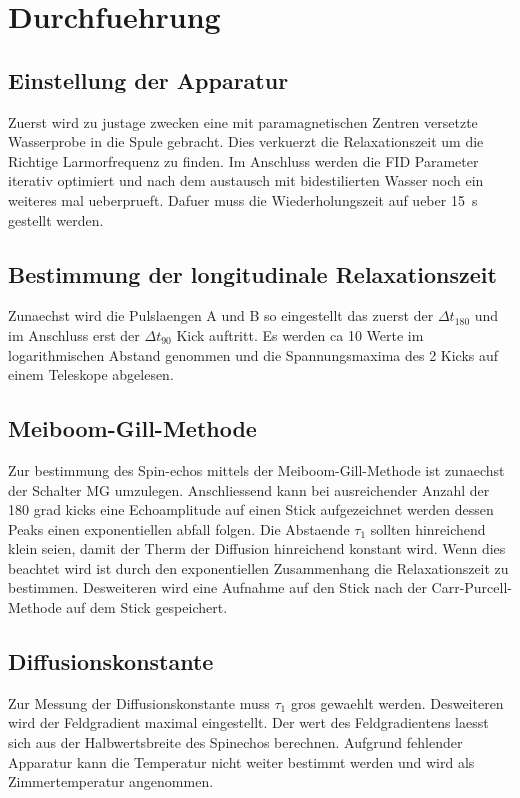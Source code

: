 \section{Durchfuehrung}%
\label{sec:durchfuehrung}

\subsection{Einstellung der Apparatur}%
\label{sub:einstellung_der_apparatur}

Zuerst wird zu justage zwecken eine mit paramagnetischen Zentren versetzte
Wasserprobe in die Spule gebracht.
Dies verkuerzt die Relaxationszeit um die Richtige Larmorfrequenz zu finden. 
Im Anschluss werden die FID Parameter iterativ optimiert und nach dem austausch
mit bidestilierten Wasser noch ein weiteres mal ueberprueft. 
Dafuer muss die Wiederholungszeit auf ueber \SI{15}{\second} gestellt werden.

\subsection{Bestimmung der longitudinale Relaxationszeit}%
\label{sub:bestimmung_der_longitudinale_relaxationszeit}
Zunaechst wird die Pulslaengen A und B so eingestellt das zuerst der 
$\Delta t_{180}$ und im Anschluss erst der $\Delta t_{90}$ Kick auftritt. 
Es werden ca 10 Werte im logarithmischen Abstand genommen und die
Spannungsmaxima des 2 Kicks auf einem Teleskope abgelesen.

\subsection{Meiboom-Gill-Methode}%
\label{sub:meiboom_gill_methode}
Zur bestimmung des Spin-echos mittels der Meiboom-Gill-Methode ist zunaechst der
Schalter MG umzulegen. Anschliessend kann bei ausreichender Anzahl der 180 grad
kicks eine Echoamplitude auf einen Stick aufgezeichnet werden dessen Peaks einen
exponentiellen abfall folgen. 
Die Abstaende $\tau_1$ sollten hinreichend klein seien, damit der Therm der
Diffusion hinreichend konstant wird.
Wenn dies beachtet wird ist durch den exponentiellen Zusammenhang die
Relaxationszeit zu bestimmen. 
Desweiteren wird eine Aufnahme auf den Stick nach der Carr-Purcell-Methode auf
dem Stick gespeichert.

\subsection{Diffusionskonstante}%
\label{sub:diffusionskonstante}
Zur Messung der Diffusionskonstante muss $\tau_1$ gros gewaehlt werden. 
Desweiteren wird der Feldgradient maximal eingestellt.
Der wert des Feldgradientens laesst sich aus der Halbwertsbreite des Spinechos
berechnen.
Aufgrund fehlender Apparatur kann die Temperatur nicht weiter bestimmt werden
und wird als Zimmertemperatur angenommen. 

